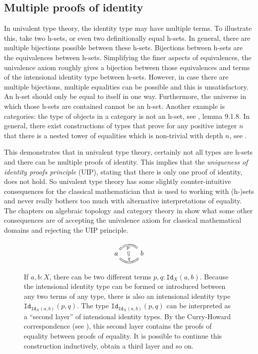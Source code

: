 \documentclass[12pt,a4paper,twoside,xetex]{book} %
\newcommand{\keyword}[1]{\emph{#1}\index{#1}}
\newcommand{\op}[1]{\mathtt{#1}}
\begin{document}
\subsection{Multiple proofs of identity}

In univalent type theory, the identity type may have multiple terms. To illustrate this, take two h-sets, or even two definitionally equal h-sets. In general, there are 
multiple bijections possible between these h-sets. Bijections between h-sets 
are the equivalences between h-sets. Simplifying the finer aspects of 
equivalences, the univalence axiom roughly gives a bijection between those equivalences and terms of the intensional identity 
type between h-sets. However, in case there are multiple bijections, 
multiple equalities can be possible and this is unsatisfactory. An h-set should only be equal to 
itself in one way. Furthermore, the universe in which those h-sets are contained 
cannot be an h-set. Another example is categories: the type of objects in a category is not an h-set, see \cite{Voevodsky2013}, lemma 9.1.8. In general, there exist constructions of types that prove for any 
positive integer $n$ that there is a nested tower of equalities which is non-trivial 
with depth $n$, see .  

This demonstrates that in univalent type theory, certainly not all types are h-sets and there can be multiple proofs of identity. This implies that the \keyword{uniqueness of identity proofs 
principle} (UIP), stating that there is only one proof of identity, does not hold. So univalent type theory has some slightly 
counter-intuitive consequences for the classical mathematician that is used to 
working with (h-)sets and never really bothers too much with alternative 
interpretations of equality. The chapters on algebraic topology and category 
theory in \cite{Voevodsky2013} show what some other consequences are of 
accepting the univalence axiom for classical mathematical domains and rejecting 
the UIP principle.

\begin{figure}\label{secondleveleq}
 \centering
 
\[ \begin{tikzcd}
a \arrow[equal, r, bend left=50, "p"{name=U, below}]
\arrow[equal, r, bend right=50, "q"{name=D}]
& b
\arrow[equal, r, from=U, to=D]
\end{tikzcd}
\]
 \caption{If $a,b:X$, there can be two different terms $p,q:\op{Id}_X(a,b)$. Because the 
 intensional identity type can be formed or introduced between any two terms of 
 any type, there is also an intensional identity type 
 $\op{Id}_{\op{Id}_X(a,b)}(p,q)$. The type $\op{Id}_{\op{Id}_X(a,b)}(p,q)$ can be interpreted as a 
``second layer'' of intensional identity types. By the Curry-Howard correspondence (see ), this second layer 
contains the proofs of equality between proofs of equality. It is possible to 
continue this construction inductively, obtain a third layer and so on. }
\end{figure}
\end{document}
